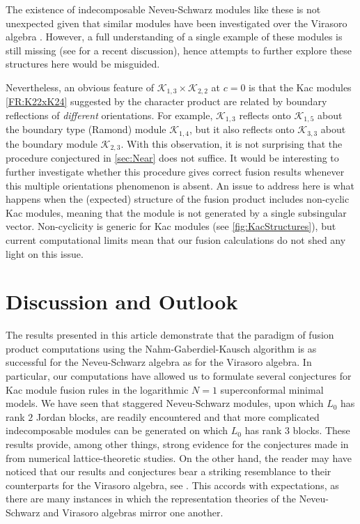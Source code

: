 \documentclass[a4paper,reqno,12pt]{report}
\theoremstyle{definition}
\numberwithin{equation}{section}
\newcommand{\Kac}[1]{\mathcal{K}_{#1}}       %
\newcommand{\fuse}{\mathbin{\times}}                                            %
\newcommand{\ssv}{subsingular vector}
\newcommand{\NGK}{Nahm-Gaberdiel-Kausch}
\newcommand{\ns}{Neveu-Schwarz}
\theoremstyle{plain}
\begin{document}
The existence of indecomposable \ns{} modules like these is not unexpected given that similar modules have been investigated over the Virasoro algebra \cite{EbeVir06}.  However, a full understanding of a single example of these modules is still missing (see \cite[Sec.~6.4]{CreLog13} for a recent discussion), hence attempts to further explore these structures here would be misguided.

Nevertheless, an obvious feature of $\Kac{1,3} \fuse \Kac{2,2}$ at $c=0$ is that the Kac modules \eqref{FR:K22xK24} suggested by the character product are related by boundary reflections of \emph{different} orientations.  For example, $\Kac{1,3}$ reflects onto $\Kac{1,5}$ about the boundary type (Ramond) module $\Kac{1,4}$, but it also reflects onto $\Kac{3,3}$ about the boundary module $\Kac{2,3}$.  With this observation, it is not surprising that the procedure conjectured in \cref{sec:Near} does not suffice.  It would be interesting to further investigate whether this procedure gives correct fusion results whenever this multiple orientations phenomenon is absent.  An issue to address here is what happens when the (expected) structure of the fusion product includes non-cyclic Kac modules, meaning that the module is not generated by a single \ssv{}.  Non-cyclicity is generic for Kac modules (see \cref{fig:KacStructures}), but current computational limits mean that our fusion calculations do not shed any light on this issue.


\chapter*{Discussion and Outlook}

The results presented in this article demonstrate that the paradigm of fusion product computations using the \NGK{} algorithm is as successful for the \ns{} algebra as for the Virasoro algebra.  In particular, our computations have allowed us to formulate several conjectures for Kac module fusion rules in the logarithmic $N=1$ superconformal minimal models.  We have seen that staggered \ns{} modules, upon which $L_0$ has rank $2$ Jordan blocks, are readily encountered and that more complicated indecomposable modules can be generated on which $L_0$ has rank $3$ blocks.  These results provide, among other things, strong evidence for the conjectures made in \cite{PeaLog14} from numerical lattice-theoretic studies.  On the other hand, the reader may have noticed that our results and conjectures bear a striking resemblance to their counterparts for the Virasoro algebra, see \cite{EbeVir06,RasFus07b,RidPer07,MorKac15}.  This accords with expectations, as there are many instances in which the representation theories of the \ns{} and Virasoro algebras mirror one another.
\end{document}
